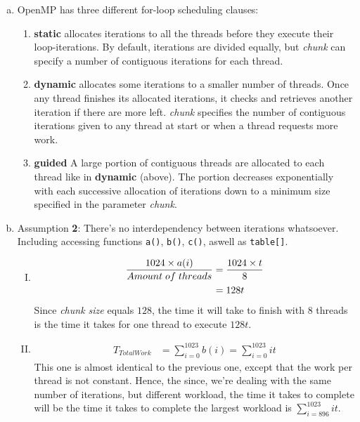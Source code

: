 \documentclass[fontsize=11pt, paper=a4, titlepage]{article}
\begin{document}
\begin{enumerate}[a)]

    \item OpenMP has three different for-loop scheduling clauses:
    \begin{enumerate}[1)]

        \item \textbf{static} allocates iterations to all the threads before
they execute their loop-iterations. By default, iterations are divided equally,
but \textit{chunk} can specify a number of contiguous iterations for each
thread.

        \item \textbf{dynamic} allocates some iterations to a smaller number of
threads. Once any thread finishes its allocated iterations, it checks and
retrieves another iteration if there are more left. \textit{chunk} specifies the
number of contiguous iterations given to any thread at start or when a thread
requests more work.

        \item \textbf{guided} A large portion of contiguous threads are
allocated to  each thread like in \textbf{dynamic} (above). The portion decreases exponentially with each successive allocation of iterations down to a minimum size specified in the parameter \textit{chunk}.

    \end{enumerate}

    \item Assumption \textbf{2}: There's no interdependency between iterations
whatsoever. Including accessing functions \lstinline!a()!, \lstinline!b()!,
\lstinline!c()!, aswell as \lstinline!table[]!.

    \begin{enumerate}[I)]

        \item\begin{align*}
            \frac{1024\times a(i)}{Amount\thickspace of\thickspace threads} &=
            \frac{1024\times t}{8}\\
            &= 128t
        \end{align*}
Since \textit{chunk size} equals $128$, the time it will take to finish with $8$
threads is the time it takes for one thread to execute $128t$.

        \item\begin{align*}
            T_{TotalWork} &= \sum_{i=0}^{1023} b(i) = \sum_{i=0}^{1023} it
        \end{align*}
This one is almost identical to the previous one, except that the work per
thread is not constant. Hence, the since, we're dealing with the same number of
iterations, but different workload, the time it takes to complete will be the
time it takes to complete the largest workload is $\sum_{i=896}^1023 it$.


\end{enumerate}
\end{enumerate}
\end{document}
